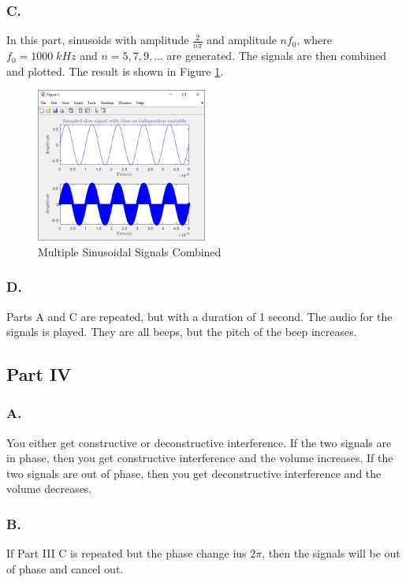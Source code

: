 \documentclass{article}
\begin{document}
\subsubsection*{C.}
In this part, sinusoids with amplitude $\frac{2}{n\pi}$ and amplitude $n f_0$,
where $f_0=1000 \; kHz$ and $n=5,7,9,...$ are generated. The signals are then combined
and plotted. The result is shown in Figure \ref{fig:fig9}.
\begin{figure}[H]
	\centering
	\includegraphics[width=0.5\textwidth]{fig 3c.png}
	\caption{Multiple Sinusoidal Signals Combined}
	\label{fig:fig9}
\end{figure}

\subsubsection*{D.}
Parts A and C are repeated, but with a duration of 1 second. The audio for the signals
is played. They are all beeps, but the pitch of the beep increases.

\subsection{Part IV}
\subsubsection*{A.}
You either get constructive or deconstructive interference. If the two signals are in 
phase, then you get constructive interference and the volume increases. If the two signals are out of phase, 
then you get deconstructive interference and the volume decreases.

\subsubsection*{B.}
If Part III C is repeated but the phase change ius $2\pi$, 
then the signals will be out of phase and cancel out.
\end{document}
